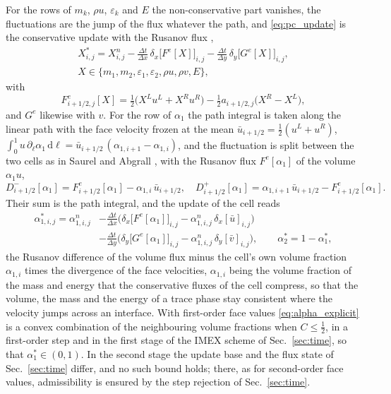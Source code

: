 For the rows of $m_k$, $\rho u$, $\varepsilon_k$ and $E$ the non-conservative part vanishes, the fluctuations are the jump of the flux
whatever the path, and \eqref{eq:pc_update} is the conservative update with the Rusanov flux
\cite{Rusanov1961},
\begin{equation}
\begin{gathered}
X^*_{i,j}=X^n_{i,j}-\frac{\Delta t}{\Delta x}\,\delta_x\big[F^e[X]\big]_{i,j}-\frac{\Delta t}{\Delta y}\,\delta_y\big[G^e[X]\big]_{i,j},\\
X\in\{m_1,m_2,\varepsilon_1,\varepsilon_2,\rho u,\rho v,E\},
\end{gathered}
\label{eq:explicit}
\end{equation}
with
\begin{equation}
F^e_{i+1/2,j}[X]=\tfrac12\big(X^Lu^L+X^Ru^R\big)-\tfrac12a_{i+1/2,j}\big(X^R-X^L\big),
\label{eq:rusanov}
\end{equation}
and $G^e$ likewise with $v$. For the row of $\alpha_1$ the path integral is taken along the linear path with the face velocity frozen at the mean
$\bar u_{i+1/2}=\tfrac12(u^L+u^R)$, $\int_0^1u\,\partial_\ell\alpha_1\,\mathrm d\ell=\bar u_{i+1/2}\,(\alpha_{1,i+1}-\alpha_{1,i})$, and the fluctuation is split
between the two cells as in Saurel and Abgrall \cite{SaurelAbgrall1999a}, with the Rusanov flux $F^e[\alpha_1]$ of the volume
$\alpha_1u$,
\begin{equation}
D^-_{i+1/2}[\alpha_1]=F^e_{i+1/2}[\alpha_1]-\alpha_{1,i}\,\bar u_{i+1/2},\quad
D^+_{i+1/2}[\alpha_1]=\alpha_{1,i+1}\,\bar u_{i+1/2}-F^e_{i+1/2}[\alpha_1].
\label{eq:pc_rusanov}
\end{equation}
Their sum is the path integral, and the update of the cell reads
\begin{equation}
\begin{aligned}
\alpha^*_{1,i,j}=\alpha^n_{1,i,j}&-\frac{\Delta t}{\Delta x}\Big(\delta_x\big[F^e[\alpha_1]\big]_{i,j}-\alpha^n_{1,i,j}\,\delta_x[\bar u]_{i,j}\Big)\\
&-\frac{\Delta t}{\Delta y}\Big(\delta_y\big[G^e[\alpha_1]\big]_{i,j}-\alpha^n_{1,i,j}\,\delta_y[\bar v]_{i,j}\Big),\qquad
\alpha^*_2=1-\alpha^*_1 ,
\end{aligned}
\label{eq:alpha_explicit}
\end{equation}
the Rusanov difference of the volume flux minus the cell's own volume fraction $\alpha_{1,i}$ times the divergence of the face
velocities, $\alpha_{1,i}$ being the volume fraction of the mass and energy that the conservative fluxes of the cell compress, so that the volume, the mass and the energy of a
trace phase stay consistent where the velocity jumps across an interface. With first-order face values \eqref{eq:alpha_explicit} is a convex combination of the neighbouring volume
fractions when $C\le\tfrac12$, in a first-order step and in the first stage of the IMEX scheme of Sec.~\ref{sec:time}, so that
$\alpha^*_1\in(0,1)$. In the second stage the update base and the flux state of Sec.~\ref{sec:time} differ, and no
such bound holds; there, as for second-order face values, admissibility is ensured by the step rejection of Sec.~\ref{sec:time}.

